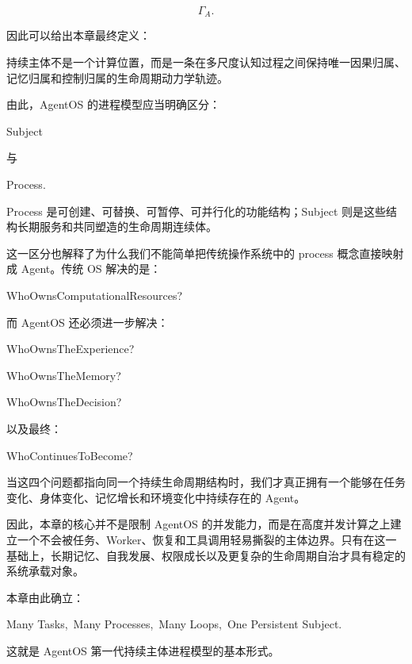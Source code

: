 \[
\Gamma_A.
\]

因此可以给出本章最终定义：

\begin{definition*}
持续主体不是一个计算位置，而是一条在多尺度认知过程之间保持唯一因果归属、记忆归属和控制归属的生命周期动力学轨迹。
\end{definition*}

由此，AgentOS 的进程模型应当明确区分：

\begin{statementbox}
Subject
\end{statementbox}

与

\begin{statementbox}
Process.
\end{statementbox}

Process 是可创建、可替换、可暂停、可并行化的功能结构；Subject 则是这些结构长期服务和共同塑造的生命周期连续体。

这一区分也解释了为什么我们不能简单把传统操作系统中的 process 概念直接映射成 Agent。传统 OS 解决的是：

\begin{statementbox}
WhoOwnsComputationalResources?
\end{statementbox}

而 AgentOS 还必须进一步解决：

\begin{statementbox}
WhoOwnsTheExperience?
\end{statementbox}

\begin{statementbox}
WhoOwnsTheMemory?
\end{statementbox}

\begin{statementbox}
WhoOwnsTheDecision?
\end{statementbox}

以及最终：

\begin{statementbox}
WhoContinuesToBecome?
\end{statementbox}

当这四个问题都指向同一个持续生命周期结构时，我们才真正拥有一个能够在任务变化、身体变化、记忆增长和环境变化中持续存在的 Agent。

因此，本章的核心并不是限制 AgentOS 的并发能力，而是在高度并发计算之上建立一个不会被任务、Worker、恢复和工具调用轻易撕裂的主体边界。只有在这一基础上，长期记忆、自我发展、权限成长以及更复杂的生命周期自治才具有稳定的系统承载对象。

本章由此确立：

\begin{statementbox}
Many Tasks,\ Many Processes,\ Many Loops,\ One Persistent Subject.
\end{statementbox}

这就是 AgentOS 第一代持续主体进程模型的基本形式。

